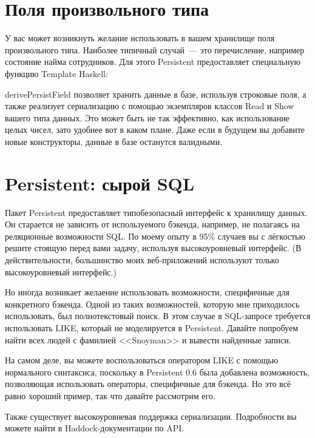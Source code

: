 \section{Поля произвольного типа}

У вас может возникнуть желание использовать в вашем хранилище поля
произвольного типа. Наиболее типичный случай~--- это перечисление, например
состояние найма сотрудников. Для этого Persistent предоставляет специальную
функцию Template Haskell:


derivePersistField позволяет хранить данные в базе, используя строковые поля, а
также реализует сериализацию с помощью экземпляров классов Read и Show вашего
типа данных. Это может быть не так эффективно, как использование целых чисел,
зато удобнее вот в каком плане. Даже если в будущем вы добавите новые
конструкторы, данные в базе останутся валидными.

\section{Persistent: сырой SQL}

Пакет Persistent предоставляет типобезопасный интерфейс к хранилищу данных. Он
старается не зависить от используемого бэкенда, например, не полагаясь на
реляционные возможности SQL. По моему опыту в 95\% случаев вы с лёгкостью
решите стоящую перед вами задачу, используя высокоуровневый интерфейс. (В
действительности, большинство моих веб-приложений используют только
высокоуровневый интерфейс.)

Но иногда возникает желаение использовать возможности, специфичные для
конкретного бэкенда. Одной из таких возможностей, которую мне приходилось
использовать, был полнотекстовый поиск. В этом случае в SQL-запросе требуется
использовать LIKE, который не моделируется в Persistent. Давайте попробуем
найти всех людей с фамилией <<Snoyman>> и вывести найденные записи.

\begin{remark}
    На самом деле, вы можете воспользоваться оператором LIKE с помощью
    нормального синтаксиса, поскольку в Persistent 0.6 была добавлена
    возможность, позволяющая использовать операторы, специфичные для бэкенда.
    Но это всё равно хороший пример, так что давайте рассмотрим его.
\end{remark}


Также существует высокоуровневая поддержка сериализации. Подробности вы можете
найти в Haddock-документации по API.

